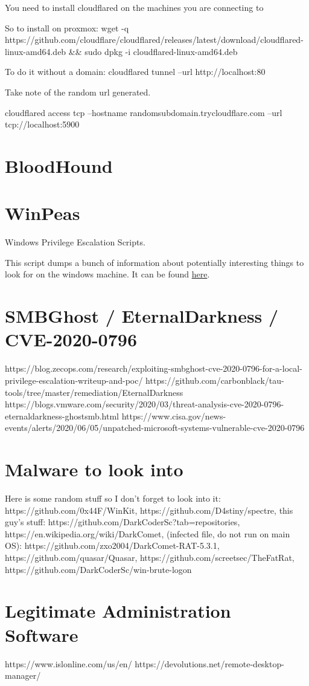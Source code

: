 \documentclass{article}
\begin{document}
You need to install cloudflared on the machines you are connecting to

So to install on proxmox:
wget -q https://github.com/cloudflare/cloudflared/releases/latest/download/cloudflared-linux-amd64.deb \&\& sudo dpkg -i cloudflared-linux-amd64.deb

To do it without a domain: cloudflared tunnel --url http://localhost:80

Take note of the random url generated.

cloudflared access tcp --hostname randomsubdomain.trycloudflare.com --url tcp://localhost:5900

\section{BloodHound}

\section{WinPeas}
Windows Privilege Escalation Scripts.

This script dumps a bunch of information about potentially interesting things to look for on
 the windows machine. It can be found \href{https://github.com/carlospolop/PEASS-ng/tree/master/winPEAS}{here}.
 

\section{SMBGhost / EternalDarkness / CVE-2020-0796}
https://blog.zecops.com/research/exploiting-smbghost-cve-2020-0796-for-a-local-privilege-escalation-writeup-and-poc/
https://github.com/carbonblack/tau-tools/tree/master/remediation/EternalDarkness
https://blogs.vmware.com/security/2020/03/threat-analysis-cve-2020-0796-eternaldarkness-ghostsmb.html
https://www.cisa.gov/news-events/alerts/2020/06/05/unpatched-microsoft-systems-vulnerable-cve-2020-0796

\section{Malware to look into}
Here is some random stuff so I don't forget to look into it:
https://github.com/0x44F/WinKit, https://github.com/D4stiny/spectre, this guy's stuff: https://github.com/DarkCoderSc?tab=repositories,
https://en.wikipedia.org/wiki/DarkComet, (infected file, do not run on main OS): https://github.com/zxo2004/DarkComet-RAT-5.3.1,
https://github.com/quasar/Quasar, https://github.com/screetsec/TheFatRat, https://github.com/DarkCoderSc/win-brute-logon

\section{Legitimate Administration Software}
https://www.islonline.com/us/en/
https://devolutions.net/remote-desktop-manager/
\end{document}

